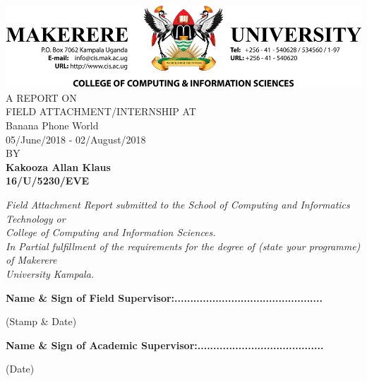 \begin{titlepage}

\begin{center}

\includegraphics[width=1\textwidth]{img/maklogo}\\%
\vspace{3em}%
\Large {A REPORT ON}\\%
\Large{FIELD ATTACHMENT/INTERNSHIP AT}\\
\normalsize Banana Phone World \\%
\vspace{1em}%
\normalsize 05/June/2018 - 02/August/2018 \\
\normalsize BY \\%
\vspace{1em}
\textup{\small {\bf Kakooza Allan Klaus}\\}
\textup{\small {\bf 16/U/5230/EVE}\\}
 \vspace{1em}%

\emph{Field Attachment Report submitted to the School of Computing and Informatics Technology or\\College of Computing and Information Sciences.\\
In Partial fulfillment of the requirements for the degree of (state your programme) of Makerere \\University Kampala.}

        \vspace{1in}

       

\raggedright {\bf Name \& Sign of Field Supervisor:...............................................} 
\begin{flushright}
\small{(Stamp \& Date)}
\end{flushright}



\raggedright{\bf Name \& Sign of Academic Supervisor:........................................} 
\begin{flushright}
\small{(Date)}
\end{flushright}



\vfill



\end{center}

\end{titlepage}
